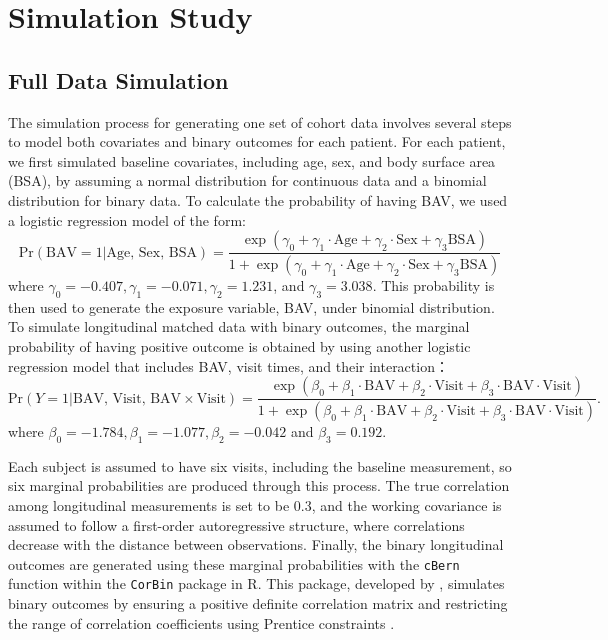 \documentclass[
]{aft}
\begin{document}
\section{Simulation Study}\label{simulation-study}

\subsection{Full Data Simulation}\label{full-data-simulation}

The simulation process for generating one set of cohort data involves
several steps to model both covariates and binary outcomes for each
patient. For each patient, we first simulated baseline covariates,
including age, sex, and body surface area (BSA), by assuming a normal
distribution for continuous data and a binomial distribution for binary
data. To calculate the probability of having BAV, we used a logistic
regression model of the form: \[
\text{Pr}(\text{BAV} = 1 | \text{Age, Sex, BSA}) = \frac{\exp(\gamma_0 + \gamma_1 \cdot \text{Age} + \gamma_2 \cdot \text{Sex} + \gamma_3 \text{BSA})}{1+\exp(\gamma_0 + \gamma_1 \cdot \text{Age} + \gamma_2 \cdot \text{Sex} + \gamma_3 \text{BSA})}
\] where \(\gamma_0 = -0.407, \gamma_1 = -0.071, \gamma_2 = 1.231\), and
\(\gamma_3 = 3.038\). This probability is then used to generate the
exposure variable, BAV, under binomial distribution. To simulate
longitudinal matched data with binary outcomes, the marginal probability
of having positive outcome is obtained by using another logistic
regression model that includes BAV, visit times, and their interaction：
\[
\text{Pr}(Y = 1 | \text{BAV, Visit, BAV} \times \text{Visit}) = \frac{\exp(\beta_0 + \beta_1 \cdot \text{BAV} + \beta_2 \cdot \text{Visit} + \beta_3 \cdot \text{BAV}\cdot \text{Visit})}{1+\exp(\beta_0 + \beta_1 \cdot \text{BAV} + \beta_2 \cdot \text{Visit} + \beta_3 \cdot \text{BAV}\cdot \text{Visit})}.
\] where \(\beta_0 = -1.784, \beta_1 = -1.077, \beta_2 = -0.042\) and
\(\beta_3 = 0.192\).

Each subject is assumed to have six visits, including the baseline
measurement, so six marginal probabilities are produced through this
process. The true correlation among longitudinal measurements is set to
be 0.3, and the working covariance is assumed to follow a first-order
autoregressive structure, where correlations decrease with the distance
between observations. Finally, the binary longitudinal outcomes are
generated using these marginal probabilities with the \texttt{cBern}
function within the \texttt{CorBin} package in R. This package,
developed by \citet{cbernWei}, simulates binary outcomes by ensuring a
positive definite correlation matrix and restricting the range of
correlation coefficients using Prentice constraints
\citep{Prentice1988}.
\end{document}
